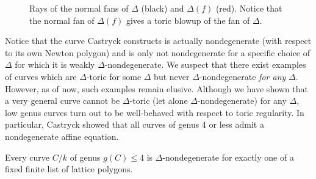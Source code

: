 \begin{figure}
\begin{center}
\end{center}
\caption{Rays of the normal fans of $\Delta$ (black) and $\Delta(f)$ (red). Notice that the normal fan of $\Delta(f)$ gives a toric blowup of the fan of $\Delta$.}
\end{figure}
\noindent
Notice that the curve Castryck constructs is actually nondegenerate (with respect to its own Newton polygon) and is only not nondegenerate for a specific choice of $\Delta$ for which it is weakly $\Delta$-nondegenerate. We suspect that there exist examples of curves which are $\Delta$-toric for some $\Delta$ but never $\Delta$-nondegenerate \textit{for any} $\Delta$. However, as of now, such examples remain elusive. Although we have shown that a very general curve cannot be $\Delta$-toric (let alone $\Delta$-nondegenerate) for any $\Delta$, low genus curves turn out to be well-behaved with respect to toric regularity. In particular, Castryck showed that all curves of genus $4$ or less admit a nondegenerate affine equation.


\begin{thm}
Every curve $C / k$ of genus $g(C) \le 4$ is $\Delta$-nondegenerate for exactly one of a fixed finite list of lattice polygons.
\end{thm}

